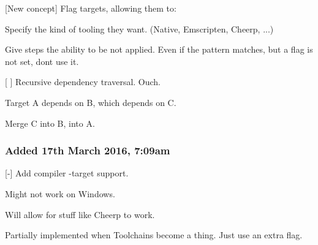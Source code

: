 \begin{DoxyItemize}
\item \mbox{[}New concept\mbox{]} Flag targets, allowing them to\+:
\begin{DoxyItemize}
\item Specify the kind of tooling they want. (Native, Emscripten, Cheerp, ...)
\item Give steps the ability to be not applied. Even if the pattern matches, but a flag is not set, dont use it.
\end{DoxyItemize}
\item \mbox{[} \mbox{]} Recursive dependency traversal. Ouch.
\begin{DoxyItemize}
\item Target A depends on B, which depends on C.
\item Merge C into B, into A.
\end{DoxyItemize}
\end{DoxyItemize}

\subsubsection*{Added 17th March 2016, 7\+:09am}


\begin{DoxyItemize}
\item \mbox{[}-\/\mbox{]} Add compiler {\ttfamily -\/target} support.
\begin{DoxyItemize}
\item Might not work on Windows.
\item Will allow for stuff like Cheerp to work.
\item Partially implemented when Toolchains become a thing. Just use an extra flag. 
\end{DoxyItemize}
\end{DoxyItemize}
